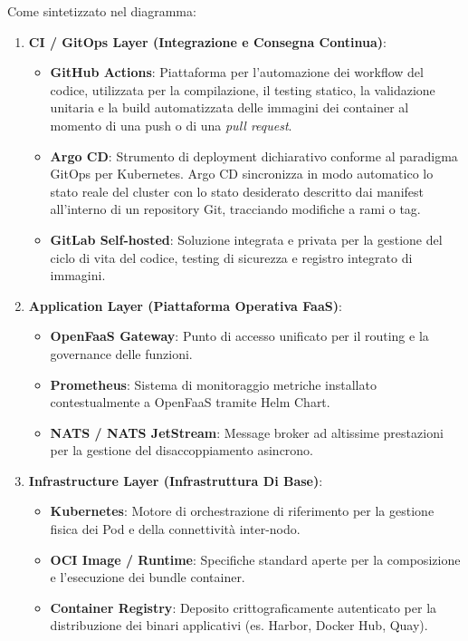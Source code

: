 \documentclass[11pt, a4paper]{article}
\begin{document}
Come sintetizzato nel diagramma:
\begin{enumerate}
    \item \textbf{CI / GitOps Layer (Integrazione e Consegna Continua)}:
    \begin{itemize}[noitemsep]
        \item \textbf{GitHub Actions}: Piattaforma per l'automazione dei workflow del codice, utilizzata per la compilazione, il testing statico, la validazione unitaria e la build automatizzata delle immagini dei container al momento di una push o di una \emph{pull request}.
        \item \textbf{Argo CD}: Strumento di deployment dichiarativo conforme al paradigma GitOps per Kubernetes. Argo CD sincronizza in modo automatico lo stato reale del cluster con lo stato desiderato descritto dai manifest all'interno di un repository Git, tracciando modifiche a rami o tag.
        \item \textbf{GitLab Self-hosted}: Soluzione integrata e privata per la gestione del ciclo di vita del codice, testing di sicurezza e registro integrato di immagini.
    \end{itemize}

    \item \textbf{Application Layer (Piattaforma Operativa FaaS)}:
    \begin{itemize}[noitemsep]
        \item \textbf{OpenFaaS Gateway}: Punto di accesso unificato per il routing e la governance delle funzioni.
        \item \textbf{Prometheus}: Sistema di monitoraggio metriche installato contestualmente a OpenFaaS tramite Helm Chart.
        \item \textbf{NATS / NATS JetStream}: Message broker ad altissime prestazioni per la gestione del disaccoppiamento asincrono.
    \end{itemize}

    \item \textbf{Infrastructure Layer (Infrastruttura Di Base)}:
    \begin{itemize}[noitemsep]
        \item \textbf{Kubernetes}: Motore di orchestrazione di riferimento per la gestione fisica dei Pod e della connettività inter-nodo.
        \item \textbf{OCI Image / Runtime}: Specifiche standard aperte per la composizione e l'esecuzione dei bundle container.
        \item \textbf{Container Registry}: Deposito crittograficamente autenticato per la distribuzione dei binari applicativi (es. Harbor, Docker Hub, Quay).
    \end{itemize}
\end{enumerate}
\end{document}
